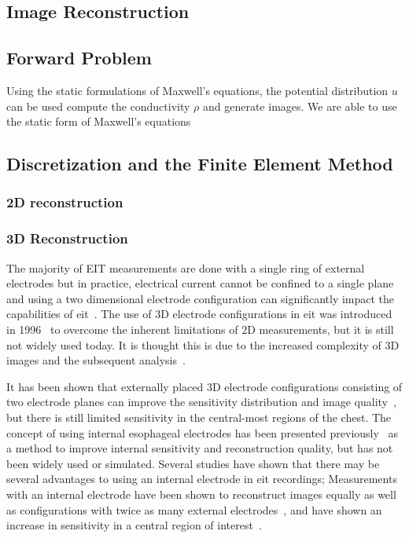 \subsection{Image Reconstruction}


\subsection{Forward Problem}
Using the static 
formulations of Maxwell's equations, the potential distribution $u$ can be used 
compute the conductivity $\rho$ and generate images.
We are able to use the static form of Maxwell's equations 

\subsection{Discretization and the Finite Element Method}


\subsubsection{2D reconstruction}

\subsubsection{3D Reconstruction}
The majority of EIT measurements are done with a single ring of external electrodes but 
in practice, electrical current cannot  be confined to a single plane
and using a two dimensional electrode configuration can significantly
impact the capabilities of \acrshort{eit}~\parencite{Rabbani1991}.
The use of 3D electrode configurations in \acrshort{eit}
was introduced in 1996~\parencite{Metherall1996} to overcome the 
inherent limitations of 2D measurements, but it is still not widely used today.
It is thought this is due to the increased complexity of 3D images
and the subsequent analysis~\parencite{Grychtol2019}.

It has been shown that externally placed 3D electrode configurations
consisting of two electrode planes
can improve the sensitivity distribution and image quality~\parencite{Grychtol2016},
but there is still limited sensitivity in the central-most regions 
of the chest.
The concept of using internal esophageal electrodes has been presented
previously~\parencite{Pilkington1989,Schuessler1995}
as a method to improve internal sensitivity 
and reconstruction quality,
but has not been widely used or simulated.
Several studies have shown that there may be several advantages to using an internal
electrode in \acrshort{eit} recordings; 
Measurements with an internal electrode have been 
shown to reconstruct images equally as well as configurations with 
twice as many external electrodes~\parencite{Schuessler1995},
and have shown an increase in sensitivity in a central region 
of interest~\parencite{Kwon2013,Czaplik2014,Farooq2014}.

